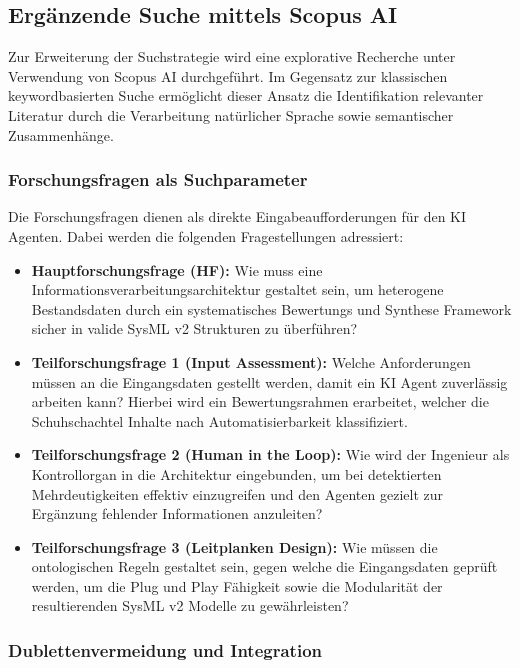 \subsection{Ergänzende Suche mittels Scopus AI}

Zur Erweiterung der Suchstrategie wird eine explorative Recherche unter Verwendung von Scopus AI durchgeführt. Im Gegensatz zur klassischen keywordbasierten Suche ermöglicht dieser Ansatz die Identifikation relevanter Literatur durch die Verarbeitung natürlicher Sprache sowie semantischer Zusammenhänge.

\subsubsection{Forschungsfragen als Suchparameter}

Die Forschungsfragen dienen als direkte Eingabeaufforderungen für den KI Agenten. Dabei werden die folgenden Fragestellungen adressiert:

\begin{itemize}
    \item \textbf{Hauptforschungsfrage (HF):} Wie muss eine Informationsverarbeitungsarchitektur gestaltet sein, um heterogene Bestandsdaten durch ein systematisches Bewertungs und Synthese Framework sicher in valide SysML v2 Strukturen zu überführen?
    \item \textbf{Teilforschungsfrage 1 (Input Assessment):} Welche Anforderungen müssen an die Eingangsdaten gestellt werden, damit ein KI Agent zuverlässig arbeiten kann? Hierbei wird ein Bewertungsrahmen erarbeitet, welcher die Schuhschachtel Inhalte nach Automatisierbarkeit klassifiziert.
    \item \textbf{Teilforschungsfrage 2 (Human in the Loop):} Wie wird der Ingenieur als Kontrollorgan in die Architektur eingebunden, um bei detektierten Mehrdeutigkeiten effektiv einzugreifen und den Agenten gezielt zur Ergänzung fehlender Informationen anzuleiten?
    \item \textbf{Teilforschungsfrage 3 (Leitplanken Design):} Wie müssen die ontologischen Regeln gestaltet sein, gegen welche die Eingangsdaten geprüft werden, um die Plug und Play Fähigkeit sowie die Modularität der resultierenden SysML v2 Modelle zu gewährleisten?
\end{itemize}

\subsubsection{Dublettenvermeidung und Integration}

